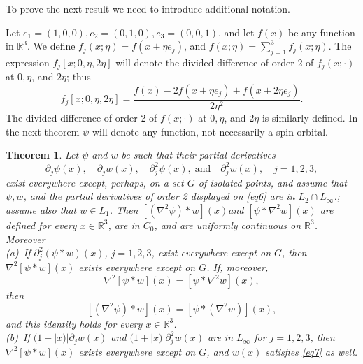 \documentclass[english, reqno]{amsart}
\newtheorem{thm}{Theorem}[]
\newcommand{\del}{\mbox{$\partial$}}
\newcommand{\IR}{\text{${\mathbb{R}}$}}
\begin{document}
To prove the next result we need to introduce additional notation.

Let  $e_1=(1,0,0), e_2=(0,1,0), e_3=(0,0,1)$, and let $f(x)$ be any function in $\IR^3$. We define $f_j(x;\eta)=f(x +\eta e_j)$, and $f(x;\eta)=\sum_{j=1}^3 f_j(x;\eta)$. The expression $f_j[x;0, \eta, 2\eta]$ will denote the divided difference of order 2 of $f_j (x;\cdot)$ at $0, \eta$, and $2\eta$; thus
\[
f_{j}[x;0, \eta, 2\eta]=\frac{f(x)-2f(x+\eta e_j) + f(x+2\eta e_j)}{2\eta^2}.
\]
The divided difference of order 2 of $f(x;\cdot)$ at $0, \eta$, and $2\eta$ is similarly defined.
In the next theorem $\psi$ will denote any function, not necessarily a spin orbital.
\begin{thm} \label{thm2}
Let $\psi$ and $w$ be such that their partial derivatives 
\begin{equation} \label{eq6}
\del_j\psi(x), \quad \del_jw(x), \quad \del^2_j\psi(x),\; \text{and}\quad\del^2_j w(x), \quad j=1, 2, 3,
\end{equation}
exist everywhere except, perhaps, on a set $G$ of isolated points, and assume that $\psi, w$, and the partial derivatives of order 2  displayed on \eqref{eq6} are in $L_2\cap L_{\infty}$.; assume also that $w\in L_1$. Then $[(\nabla^2\psi )\ast w](x) $and $[\psi\ast \nabla^2w](x)$ are  defined for every $x \in \IR^3$, are in $C_0$, and are uniformly continuous on $\IR^3$. Moreover\\
(a)\ If  $\del^2_j(\psi\ast w)(x)$, $j=1,2,3$,  exist everywhere except on $G$, then $\nabla^2[\psi\ast w](x)$ exists everywhere except on $G$. If, moreover,
\begin{equation} \label{eq7}
\nabla^2[\psi\ast w](x)= [\psi\ast \nabla^2w](x),
\end{equation}
then 
\[
[(\nabla^2\psi )\ast w](x)= [\psi \ast (\nabla^2 w)](x),
\]
and this identity holds for every $x \in \IR^3$.\\
(b)\ If $(1+|x)|\del_jw(x)$ and $(1+|x)|\del^2_jw(x)$ are in $L_{\infty}$ for $j=1,2,3$, then $\nabla^2[\psi\ast w](x)$ exists everywhere except on $G$, and $w(x)$ satisfies \eqref{eq7} as well.
\end{thm}
\end{document}
